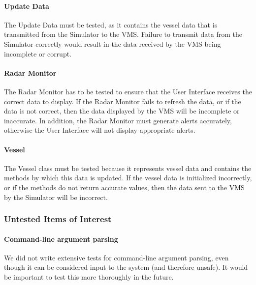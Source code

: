 \documentclass{article}
\begin{document}
\paragraph{Update Data \\}
The Update Data must be tested, as it contains the vessel data that is transmitted from the Simulator to the VMS. Failure to transmit data from the Simulator correctly would result in the data received by the VMS being incomplete or corrupt.

\paragraph{Radar Monitor \\}
The Radar Monitor has to be tested to ensure that the User Interface receives the correct data to display. If the Radar Monitor fails to refresh the data, or if the data is not correct, then the data displayed by the VMS will be incomplete or inaccurate. In addition, the Radar Monitor must generate alerts accurately, otherwise the User Interface will not display appropriate alerts.

\paragraph{Vessel \\}
The Vessel class must be tested because it represents vessel data and contains the methods by which this data is updated. If the vessel data is initialized incorrectly, or if the methods do not return accurate values, then the data sent to the VMS by the Simulator will be incorrect.

\subsubsection{Untested Items of Interest} %


\paragraph{Command-line argument parsing \\}
We did not write extensive tests for command-line argument parsing, even though it can be considered input to the system (and therefore unsafe). It would be important to test this more thoroughly in the future.
\end{document}
